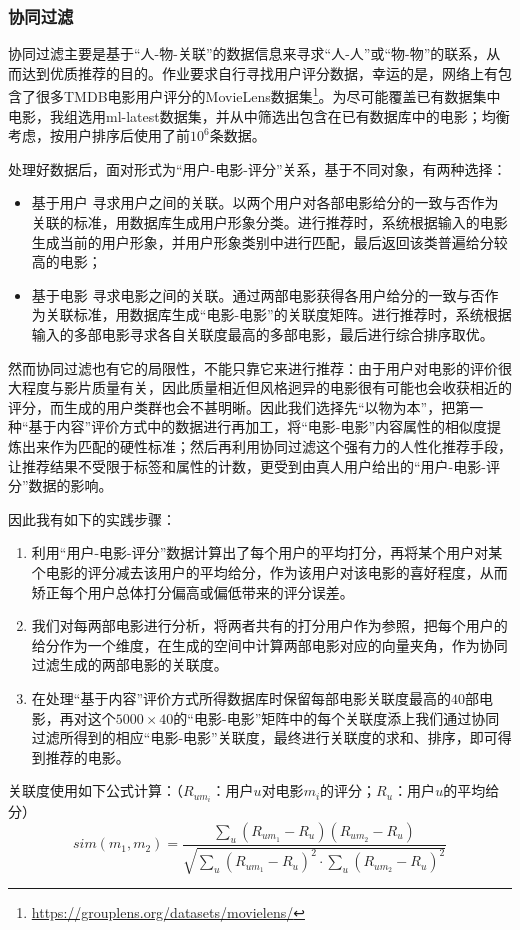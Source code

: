 \documentclass[UTF8]{ctexart}
\begin{document}
\subsubsection{协同过滤}
\par 协同过滤主要是基于“人-物-关联”的数据信息来寻求“人-人”或“物-物”的联系，从而达到优质推荐的目的。作业要求自行寻找用户评分数据，幸运的是，网络上有包含了很多TMDB电影用户评分的MovieLens数据集\footnote{\href{https://grouplens.org/datasets/movielens/}{https://grouplens.org/datasets/movielens/}}。为尽可能覆盖已有数据集中电影，我组选用ml-latest数据集，并从中筛选出包含在已有数据库中的电影；均衡考虑，按用户排序后使用了前$10^6$条数据。
\par 处理好数据后，面对形式为“用户-电影-评分”关系，基于不同对象，有两种选择：
\begin{itemize}
  \item{基于用户} 寻求用户之间的关联。以两个用户对各部电影给分的一致与否作为关联的标准，用数据库生成用户形象分类。进行推荐时，系统根据输入的电影生成当前的用户形象，并用户形象类别中进行匹配，最后返回该类普遍给分较高的电影；
	\item{基于电影} 寻求电影之间的关联。通过两部电影获得各用户给分的一致与否作为关联标准，用数据库生成“电影-电影”的关联度矩阵。进行推荐时，系统根据输入的多部电影寻求各自关联度最高的多部电影，最后进行综合排序取优。
\end{itemize}
\par 然而协同过滤也有它的局限性，不能只靠它来进行推荐：由于用户对电影的评价很大程度与影片质量有关，因此质量相近但风格迥异的电影很有可能也会收获相近的评分，而生成的用户类群也会不甚明晰。因此我们选择先“以物为本”，把第一种“基于内容”评价方式中的数据进行再加工，将“电影-电影”内容属性的相似度提炼出来作为匹配的硬性标准；然后再利用协同过滤这个强有力的人性化推荐手段，让推荐结果不受限于标签和属性的计数，更受到由真人用户给出的“用户-电影-评分”数据的影响。
\par 因此我有如下的实践步骤：
\begin{enumerate}
  \item 利用“用户-电影-评分”数据计算出了每个用户的平均打分，再将某个用户对某个电影的评分减去该用户的平均给分，作为该用户对该电影的喜好程度，从而矫正每个用户总体打分偏高或偏低带来的评分误差。
  \item 我们对每两部电影进行分析，将两者共有的打分用户作为参照，把每个用户的给分作为一个维度，在生成的空间中计算两部电影对应的向量夹角，作为协同过滤生成的两部电影的关联度。
  \item 在处理“基于内容”评价方式所得数据库时保留每部电影关联度最高的$40$部电影，再对这个$5000\times 40$的“电影-电影”矩阵中的每个关联度添上我们通过协同过滤所得到的相应“电影-电影”关联度，最终进行关联度的求和、排序，即可得到推荐的电影。
\end{enumerate}
\par 关联度使用如下公式计算：（$R_{um_i}$：用户$u$对电影$m_i$的评分；$R_u$：用户$u$的平均给分）
$$ sim(m_1,m_2)=\frac{\sum_u{(R_{um_1}-R_u)(R_{um_2}-R_u)}}{\sqrt{\sum_u{(R_{um_1}-R_u)^2}\cdot {\sum_u{(R_{um_2}-R_u)^2}}}} $$
\end{document}
